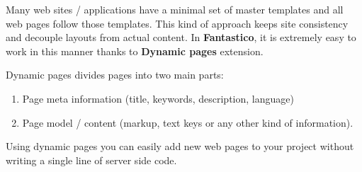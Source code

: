 \documentclass[letterpaper,10pt,english]{sphinxmanual}
\begin{document}
Many web sites / applications have a minimal set of master templates and all web pages follow those templates. This kind of
approach keeps site consistency and decouple layouts from actual content. In \textbf{Fantastico}, it is extremely easy to work in this
manner thanks to \textbf{Dynamic pages} extension.

Dynamic pages divides pages into two main parts:
\begin{enumerate}
\item {} 
Page meta information (title, keywords, description, language)

\item {} 
Page model / content (markup, text keys or any other kind of information).

\end{enumerate}

Using dynamic pages you can easily add new web pages to your project without writing a single line of server side code.
\end{document}
